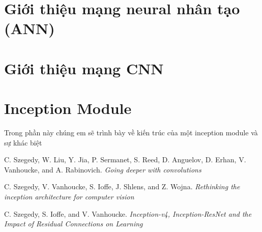 \documentclass[a4paper,12pt]{report}
\begin{document}
\chapter{Giới thiệu mạng neural nhân tạo (ANN)}

\chapter{Giới thiệu mạng CNN}

\chapter{Inception Module}
Trong phần này chúng em sẽ trình bày về kiến trúc của một inception module và sự khác biệt 

\begin{thebibliography}{9}
 C. Szegedy, W. Liu, Y. Jia, P. Sermanet, S. Reed, D. Anguelov, D. Erhan, V. Vanhoucke, and A. Rabinovich. \textit{Going deeper with convolutions}

 C. Szegedy, V. Vanhoucke, S. Ioffe, J. Shlens, and Z. Wojna. \textit{Rethinking the inception architecture for computer vision}

 C. Szegedy, S. Ioffe, and V. Vanhoucke. \textit{Inception-v4, Inception-ResNet and the Impact of Residual Connections on Learning}

\end{thebibliography}
\end{document}
